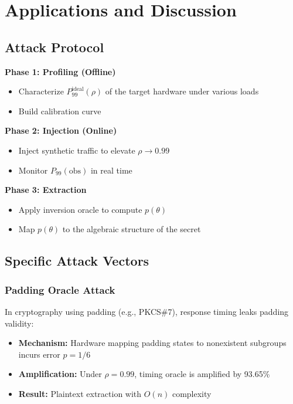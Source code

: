 \documentclass[11pt]{article}
\begin{document}
\section{Applications and Discussion}
\label{sec:applications}

\subsection{Attack Protocol}

\textbf{Phase 1: Profiling (Offline)}
\begin{itemize}
    \item Characterize $P_{99}^{\text{ideal}}(\rho)$ of the target hardware under various loads
    \item Build calibration curve
\end{itemize}

\textbf{Phase 2: Injection (Online)}
\begin{itemize}
    \item Inject synthetic traffic to elevate $\rho \to 0.99$
    \item Monitor $P_{99}(\text{obs})$ in real time
\end{itemize}

\textbf{Phase 3: Extraction}
\begin{itemize}
    \item Apply inversion oracle to compute $p(\theta)$
    \item Map $p(\theta)$ to the algebraic structure of the secret
\end{itemize}

\subsection{Specific Attack Vectors}

\subsubsection{Padding Oracle Attack}

In cryptography using padding (e.g., PKCS\#7), response timing leaks padding validity:
\begin{itemize}
    \item \textbf{Mechanism:} Hardware mapping padding states to nonexistent subgroups incurs error $p = 1/6$
    \item \textbf{Amplification:} Under $\rho = 0.99$, timing oracle is amplified by 93.65\%
    \item \textbf{Result:} Plaintext extraction with $O(n)$ complexity
\end{itemize}
\end{document}
